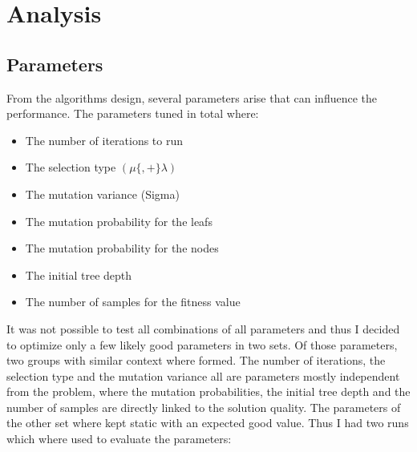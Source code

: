\documentclass[conference]{IEEEtran}
\begin{document}
\section{Analysis}
\subsection{Parameters}
From the algorithms design, several parameters arise that can influence the performance. The parameters tuned in total where:

\begin{itemize}
\item The number of iterations to run
\item The selection type $(\mu \{, +\} \lambda)$
\item The mutation variance (Sigma)
\item The mutation probability for the leafs
\item The mutation probability for the nodes
\item The initial tree depth
\item The number of samples for the fitness value
\end{itemize}

It was not possible to test all combinations of all parameters and thus I decided to optimize only a few likely good parameters in two sets.
Of those parameters, two groups with similar context where formed. 
The number of iterations, the selection type and the mutation variance all are parameters mostly independent from the problem, where the mutation probabilities, the initial tree depth  and the number of samples are directly linked to the solution quality. The parameters of the other set where kept static with an expected good value. Thus I had two runs which where used to evaluate the parameters:
\end{document}
